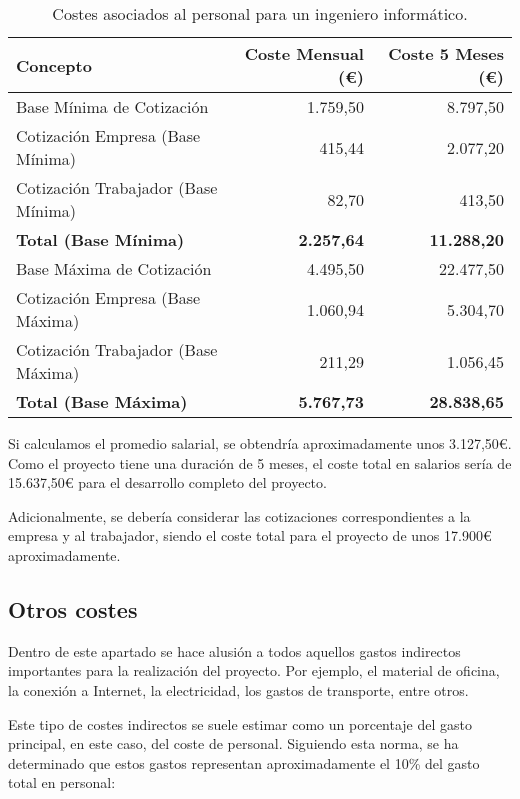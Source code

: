 \begin{table}[H]
    \centering
    \small 
    \setlength{\tabcolsep}{1.8pt}
    \begin{tabular}{@{}lrr@{}}
        \toprule
        \textbf{Concepto} & \textbf{Coste Mensual (€)} & \textbf{Coste 5 Meses (€)} \\
        \midrule
        Base Mínima de Cotización & 1.759,50 & 8.797,50 \\
        Cotización Empresa (Base Mínima) & 415,44 & 2.077,20 \\
        Cotización Trabajador (Base Mínima) & 82,70 & 413,50 \\
        \textbf{Total (Base Mínima)} & \textbf{2.257,64} & \textbf{11.288,20} \\
        \midrule
        Base Máxima de Cotización & 4.495,50 & 22.477,50 \\
        Cotización Empresa (Base Máxima) & 1.060,94 & 5.304,70 \\
        Cotización Trabajador (Base Máxima) & 211,29 & 1.056,45 \\
        \textbf{Total (Base Máxima)} & \textbf{5.767,73} & \textbf{28.838,65} \\
        \bottomrule
    \end{tabular}

    \caption{Costes asociados al personal para un ingeniero informático.}
    \label{tab:coste-personal}

\end{table}

Si calculamos el promedio salarial, se obtendría aproximadamente unos 3.127,50€. Como el proyecto tiene una duración de 5 meses, el coste total en salarios sería de 15.637,50€ para el desarrollo completo del proyecto.

Adicionalmente, se debería considerar las cotizaciones correspondientes a la empresa y al trabajador, siendo el coste total para el proyecto de unos 17.900€ aproximadamente. 

\subsection{Otros costes}

Dentro de este apartado se hace alusión a todos aquellos gastos indirectos importantes para la realización del proyecto. Por ejemplo, el material de oficina, la conexión a Internet, la electricidad, los gastos de transporte, entre otros.

Este tipo de costes indirectos se suele estimar como un porcentaje del gasto principal, en este caso, del coste de personal. Siguiendo esta norma, se ha determinado que estos gastos representan aproximadamente el 10\% del gasto total en personal:

